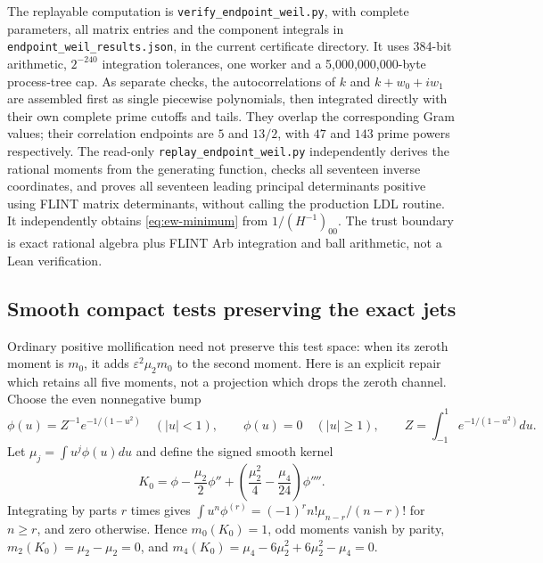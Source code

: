 The replayable computation is
\texttt{verify\_endpoint\_weil.py}, with complete parameters, all
matrix entries and the component integrals in
\texttt{endpoint\_weil\_results.json}, in the current certificate
directory. It uses 384-bit arithmetic, $2^{-240}$ integration
tolerances, one worker and a 5,000,000,000-byte process-tree cap.
As separate checks, the autocorrelations of $k$ and $k+w_0+iw_1$
are assembled first as single piecewise polynomials, then integrated
directly with their own complete prime cutoffs and tails. They
overlap the corresponding Gram values; their correlation endpoints
are $5$ and $13/2$, with $47$ and $143$ prime powers respectively.
The read-only \texttt{replay\_endpoint\_weil.py} independently
derives the rational moments from the generating function, checks
all seventeen inverse coordinates, and proves all seventeen leading
principal determinants positive using FLINT matrix determinants,
without calling the production LDL routine. It independently obtains
\eqref{eq:ew-minimum} from $1/(H^{-1})_{00}$.
The trust boundary is exact rational algebra plus FLINT Arb integration
and ball arithmetic, not a Lean verification.

\subsection{Smooth compact tests preserving the exact jets}

Ordinary positive mollification need not preserve this test space:
when its zeroth moment is $m_0$, it adds
$\varepsilon^2\mu_2m_0$ to the second moment. Here is an explicit
repair which retains all five moments, not a projection which drops
the zeroth channel.
Choose the even nonnegative bump
\[
 \phi(u)=Z^{-1}e^{-1/(1-u^2)}\quad(|u|<1),\qquad
 \phi(u)=0\quad(|u|\ge1),\qquad
 Z=\int_{-1}^1e^{-1/(1-u^2)}du.
\]
Let $\mu_j=\int u^j\phi(u)du$ and define the signed smooth kernel
\begin{equation}
 K_0=\phi-\frac{\mu_2}{2}\phi''+
           \left(\frac{\mu_2^2}{4}-\frac{\mu_4}{24}\right)\phi''''.
 \label{eq:ew-kernel}
\end{equation}
Integrating by parts $r$ times gives
$\int u^n\phi^{(r)}=(-1)^r n!\mu_{n-r}/(n-r)!$ for $n\ge r$,
and zero otherwise. Hence $m_0(K_0)=1$, odd moments vanish by
parity, $m_2(K_0)=\mu_2-\mu_2=0$, and
$m_4(K_0)=\mu_4-6\mu_2^2+6\mu_2^2-\mu_4=0$.

